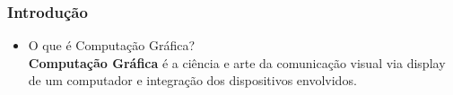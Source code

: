 \documentclass{beamer}
\begin{document}
\begin{frame}
\frametitle{Introdução}

\begin{itemize}
	\item O que é Computação Gráfica? \\
	\textbf{Computação Gráfica} é a ciência e arte da comunicação visual via display de um computador e integração dos dispositivos envolvidos.
	\begin{figure}[htb!]
  \centering
    \qquad
   \qquad
  \label{iep}
\end{figure}

\end{itemize}
\end{frame}

\end{document}
